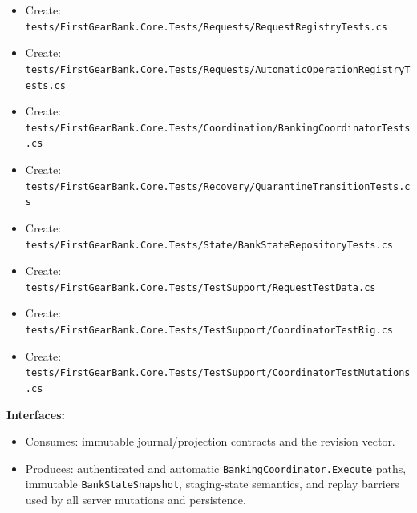 \documentclass[
  10pt,
  letterpaper,
]{article}
\newcommand{\passthrough}[1]{#1}
\providecommand{\tightlist}{%
  \setlength{\itemsep}{0pt}\setlength{\parskip}{0pt}}
\begin{document}
\begin{itemize}
\item
  Create:
  \texttt{tests/}\allowbreak{}\texttt{FirstGearBank.}\allowbreak{}\texttt{Core.}\allowbreak{}\texttt{Tests/}\allowbreak{}\texttt{Requests/}\allowbreak{}\texttt{RequestRegistryTests.}\allowbreak{}\texttt{cs}
\item
  Create:
  \texttt{tests/}\allowbreak{}\texttt{FirstGearBank.}\allowbreak{}\texttt{Core.}\allowbreak{}\texttt{Tests/}\allowbreak{}\texttt{Requests/}\allowbreak{}\texttt{AutomaticOperationRegistryTests.}\allowbreak{}\texttt{cs}
\item
  Create:
  \texttt{tests/}\allowbreak{}\texttt{FirstGearBank.}\allowbreak{}\texttt{Core.}\allowbreak{}\texttt{Tests/}\allowbreak{}\texttt{Coordination/}\allowbreak{}\texttt{BankingCoordinatorTests.}\allowbreak{}\texttt{cs}
\item
  Create:
  \texttt{tests/}\allowbreak{}\texttt{FirstGearBank.}\allowbreak{}\texttt{Core.}\allowbreak{}\texttt{Tests/}\allowbreak{}\texttt{Recovery/}\allowbreak{}\texttt{QuarantineTransitionTests.}\allowbreak{}\texttt{cs}
\item
  Create:
  \texttt{tests/}\allowbreak{}\texttt{FirstGearBank.}\allowbreak{}\texttt{Core.}\allowbreak{}\texttt{Tests/}\allowbreak{}\texttt{State/}\allowbreak{}\texttt{BankStateRepositoryTests.}\allowbreak{}\texttt{cs}
\item
  Create:
  \texttt{tests/}\allowbreak{}\texttt{FirstGearBank.}\allowbreak{}\texttt{Core.}\allowbreak{}\texttt{Tests/}\allowbreak{}\texttt{TestSupport/}\allowbreak{}\texttt{RequestTestData.}\allowbreak{}\texttt{cs}
\item
  Create:
  \texttt{tests/}\allowbreak{}\texttt{FirstGearBank.}\allowbreak{}\texttt{Core.}\allowbreak{}\texttt{Tests/}\allowbreak{}\texttt{TestSupport/}\allowbreak{}\texttt{CoordinatorTestRig.}\allowbreak{}\texttt{cs}
\item
  Create:
  \texttt{tests/}\allowbreak{}\texttt{FirstGearBank.}\allowbreak{}\texttt{Core.}\allowbreak{}\texttt{Tests/}\allowbreak{}\texttt{TestSupport/}\allowbreak{}\texttt{CoordinatorTestMutations.}\allowbreak{}\texttt{cs}
\end{itemize}

\textbf{Interfaces:}

\begin{itemize}
\tightlist
\item
  Consumes: immutable journal/projection contracts and the revision
  vector.
\item
  Produces: authenticated and automatic
  \texttt{BankingCoordinator.}\allowbreak{}\texttt{Execute} paths,
  immutable \passthrough{\lstinline!BankStateSnapshot!}, staging-state
  semantics, and replay barriers used by all server mutations and
  persistence.
\end{itemize}
\end{document}

